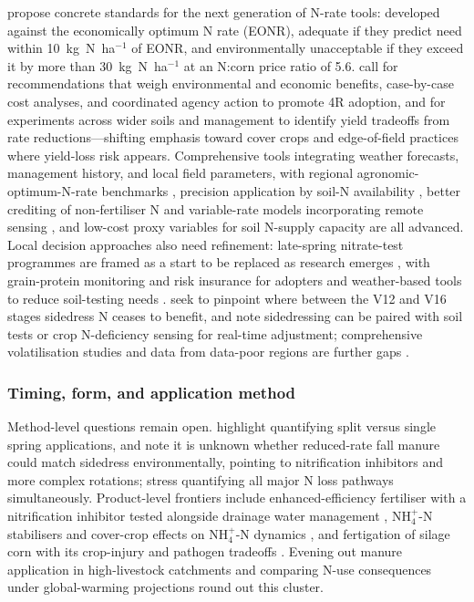 \textcite{Bandura2025} propose concrete standards for the next generation of
N-rate tools: developed against the economically optimum N rate (EONR),
adequate if they predict need within 10~kg~N~ha$^{-1}$ of EONR, and
environmentally unacceptable if they exceed it by more than 30~kg~N~ha$^{-1}$ at
an N:corn price ratio of 5.6. \textcite{Liu2021} call for recommendations that
weigh environmental and economic benefits, case-by-case cost analyses, and
coordinated agency action to promote 4R adoption, and \textcite{Banger2018} for
experiments across wider soils and management to identify yield tradeoffs from
rate reductions---shifting emphasis toward cover crops and edge-of-field
practices where yield-loss risk appears. Comprehensive tools integrating weather
forecasts, management history, and local field parameters, with regional
agronomic-optimum-N-rate benchmarks \parencite{Maas2022}, precision application
by soil-N availability \parencite{Gupta2023}, better crediting of non-fertiliser
N and variable-rate models incorporating remote sensing \parencite{Dinnes2002},
and low-cost proxy variables for soil N-supply capacity \parencite{Cassman2025}
are all advanced. Local decision approaches also need refinement: late-spring
nitrate-test programmes are framed as a start to be replaced as research emerges
\parencite{Jaynes2004}, with grain-protein monitoring and risk insurance for
adopters \parencite{Karlen2005} and weather-based tools to reduce soil-testing
needs \parencite{Malone2010}. \textcite{Jaynes2013} seek to pinpoint where
between the V12 and V16 stages sidedress N ceases to benefit, and
\textcite{Jaynes2015} note sidedressing can be paired with soil tests or crop
N-deficiency sensing for real-time adjustment; comprehensive volatilisation
studies and data from data-poor regions are further gaps \parencite{Chatterjee2020b}.

\subsubsection{Timing, form, and application method}

Method-level questions remain open. \textcite{Malone2007b} highlight quantifying
split versus single spring applications, and \textcite{HernandezRamirez2011}
note it is unknown whether reduced-rate fall manure could match sidedress
environmentally, pointing to nitrification inhibitors and more complex
rotations; \textcite{Elmi2005} stress quantifying all major N loss pathways
simultaneously. Product-level frontiers include enhanced-efficiency fertiliser
with a nitrification inhibitor tested alongside drainage water management
\parencite{Kaur2024c}, NH$_4^+$-N stabilisers and cover-crop effects on
NH$_4^+$-N dynamics \parencite{Vincent2025}, and fertigation of silage corn with
its crop-injury and pathogen tradeoffs \parencite{Gamble2018}. Evening out
manure application in high-livestock catchments \parencite{Bechmann2014} and
comparing N-use consequences under global-warming projections
\parencite{Haghnazari2020} round out this cluster.

